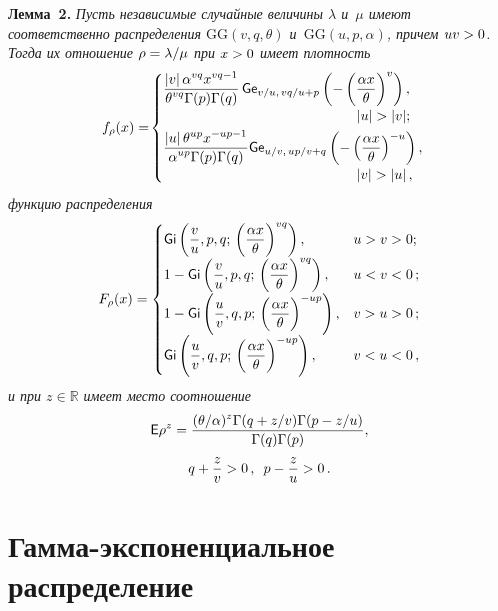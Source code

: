 \begin{multicols}{2}

\noindent
\textbf{Лемма~2.}
\textit{Пусть независимые случайные величины $\lambda$ и~$\mu$ имеют соответственно 
распределения $\mathrm{GG}(v,q,\theta)$ и~$\mathrm{GG}(u,p,\alpha)$, причем $uv\hm>0$. Тогда их 
отношение $\rho\hm=\lambda/\mu$ при $x\hm>0$ имеет плотность}
\begin{multline*}
\hspace*{-8pt}f_{\rho}(x) =\!
 \begin{cases}
   \displaystyle \fr{\abs{v}\alpha^{vq}x^{vq-
1}}{\theta^{vq}\Gamma(p)\Gamma(q)}\,{\sf Ge}_{v/u,\, vq/u+p}\left(-\left(\fr{\alpha 
x}{\theta}\right)^{v}\right), &\\
&\hspace*{-20mm}|u|>|v|;\\[3pt]
   \displaystyle \fr{\abs{u}\theta^{up}x^{-up-
1}}{\alpha^{up}\Gamma(p)\Gamma(q)}{\sf Ge}_{u/v,\, up/v+q}\left(-\left(\frac{\alpha 
x}{\theta}\right)^{-u}\right), &\\
&\hspace*{-20mm}|v|>|u|\,,
 \end{cases}\hspace*{-23pt}
\end{multline*}
\textit{функцию распределения}
$$
F_{\rho}(x) =
 \begin{cases}
   \displaystyle {\sf Gi}\left(\displaystyle\frac{\displaystyle v\mathstrut}{\displaystyle u\mathstrut},p,q;\,\left(\displaystyle\frac{\displaystyle \alpha x\mathstrut}{\displaystyle \theta\mathstrut}\right)^{vq}\right), 
& u>v>0;\\[6pt]
   \displaystyle 1-{\sf Gi}\left(\displaystyle\frac{\displaystyle v\mathstrut}{\displaystyle u\mathstrut},p,q;\,\left(\displaystyle\frac{\displaystyle \alpha x\mathstrut}{\displaystyle \theta\mathstrut}\right)^{vq}\right), 
&u<v<0\,;\\[6pt]
   \displaystyle 1-{\sf Gi}\left(\displaystyle\frac{\displaystyle u\mathstrut}{\displaystyle v\mathstrut},q,p;\,\left(\displaystyle\frac{\displaystyle \alpha x\mathstrut}{\displaystyle \theta\mathstrut}\right)^{-up}\right), 
&v>u>0\,;\\[6pt]
   \displaystyle {\sf Gi}\left(\displaystyle\frac{\displaystyle u\mathstrut}{\displaystyle v\mathstrut},q,p;\,\left(\displaystyle\frac{\displaystyle \alpha x\mathstrut}{\displaystyle \theta\mathstrut}\right)^{-up}\right), 
&v<u<0\,,
 \end{cases}
$$
\textit{и при $z\in\mathbb{R}$ имеет место соотношение}
\begin{multline*}
{\sf E}\rho^z=\displaystyle\frac{\displaystyle (\theta/\alpha)^{z} \Gamma(q+z/v)\Gamma(p-
z/u)\mathstrut}{\displaystyle \Gamma(q)\Gamma(p)\mathstrut}, \\
   q+\displaystyle\frac{\displaystyle z\mathstrut}{\displaystyle v\mathstrut}>0\,, \enskip  p-\displaystyle\frac{\displaystyle z\mathstrut}{\displaystyle u\mathstrut}>0\,.
\end{multline*}

\section{Гамма-экспоненциальное распределение}


\end{multicols}
